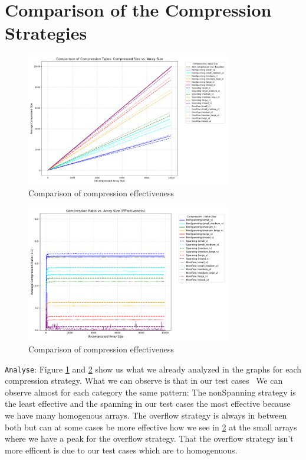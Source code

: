 \documentclass[11pt, a4paper]{article}
\begin{document}
	\section{Comparison of the Compression Strategies}
	\begin{figure}[H]%
		\centering
		\includegraphics[width=0.8\textwidth]{Grafics/Compare/Comparingcompression.png}
		\caption{Comparison of compression effectiveness}
		\label{fig:31}
	\end{figure}
	\begin{figure}[H]%
		\centering
		\includegraphics[width=0.8\textwidth]{Grafics/Compare/ComparingEffectivenesscompression.png}
		\caption{Comparison of compression effectiveness}
		\label{fig:32}
	\end{figure}
	\texttt{Analyse}: Figure \ref{fig:31} and \ref{fig:32} show us what we already analyzed in the graphs for each compression strategy. What we can observe is that in our test cases  We can observe almost for each category the same pattern: The nonSpanning strategy is the least effective and the spanning in our test cases the most effective because we have many homogenous arrays. The overflow strategy is always in between both but can at some cases be more effective how we see in \ref{fig:32} at the small arrays where we have a peak for the overflow strategy. That the overflow strategy isn't more efficent is due to our test cases which are to homogenuous.
\end{document}
